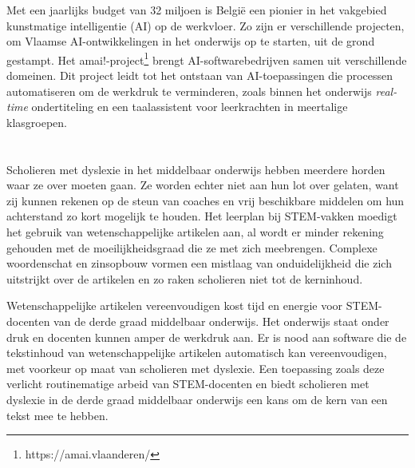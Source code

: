 Met een jaarlijks budget van 32 miljoen is België een pionier \autocite{Crevits2022} in het vakgebied kunstmatige intelligentie (AI) op de werkvloer.  Zo zijn er verschillende projecten, om Vlaamse AI-ontwikkelingen in het onderwijs op te starten, uit de grond gestampt. Het amai!-project\footnote{https://amai.vlaanderen/}  brengt AI-softwarebedrijven samen uit verschillende domeinen. Dit project leidt tot het ontstaan van AI-toepassingen die processen automatiseren om de werkdruk te verminderen, zoals binnen het onderwijs \textit{real-time} ondertiteling en een taalassistent voor leerkrachten in meertalige klasgroepen.

\section{}%
\label{sec:probleemstelling}


Scholieren met dyslexie in het middelbaar onderwijs hebben meerdere horden waar ze over moeten gaan. Ze worden echter niet aan hun lot over gelaten, want zij kunnen rekenen op de steun van coaches en vrij beschikbare middelen om hun achterstand zo kort mogelijk te houden. Het leerplan bij STEM-vakken moedigt het gebruik van wetenschappelijke artikelen aan, al wordt er minder rekening gehouden met de moeilijkheidsgraad die ze met zich meebrengen. Complexe woordenschat en zinsopbouw vormen een mistlaag van onduidelijkheid die zich uitstrijkt over de artikelen en zo raken scholieren niet tot de kerninhoud.

Wetenschappelijke artikelen vereenvoudigen kost tijd en energie voor STEM-docenten van de derde graad middelbaar onderwijs. Het onderwijs staat onder druk en docenten kunnen amper de werkdruk aan. Er is nood aan software die de tekstinhoud van wetenschappelijke artikelen automatisch kan vereenvoudigen, met voorkeur op maat van scholieren met dyslexie. Een toepassing zoals deze verlicht routinematige arbeid van STEM-docenten en biedt scholieren met dyslexie in de derde graad middelbaar onderwijs een kans om de kern van een tekst mee te hebben.


